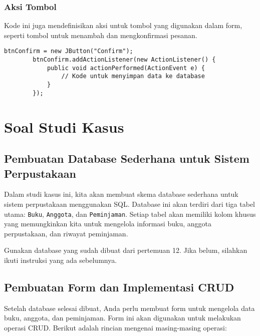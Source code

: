 \subsubsection{Aksi Tombol}
Kode ini juga mendefinisikan aksi untuk tombol yang digunakan dalam form, seperti tombol untuk menambah dan mengkonfirmasi pesanan.
	
\begin{lstlisting}[style=javaStyle]
		btnConfirm = new JButton("Confirm");
		btnConfirm.addActionListener(new ActionListener() {
			public void actionPerformed(ActionEvent e) {
				// Kode untuk menyimpan data ke database
			}
		});
\end{lstlisting}


\section{Soal Studi Kasus}

\subsection{Pembuatan Database Sederhana untuk Sistem Perpustakaan}

Dalam studi kasus ini, kita akan membuat skema database sederhana untuk sistem perpustakaan menggunakan SQL. Database ini akan terdiri dari tiga tabel utama: \texttt{Buku}, \texttt{Anggota}, dan \texttt{Peminjaman}. Setiap tabel akan memiliki kolom khusus yang memungkinkan kita untuk mengelola informasi buku, anggota perpustakaan, dan riwayat peminjaman.

Gunakan database yang sudah dibuat dari pertemuan 12. Jika belum, silahkan ikuti instruksi yang ada sebelumnya.

\subsection{Pembuatan Form dan Implementasi CRUD}
Setelah database selesai dibuat, Anda perlu membuat form untuk mengelola data buku, anggota, dan peminjaman. Form ini akan digunakan untuk melakukan operasi CRUD. Berikut adalah rincian mengenai masing-masing operasi:

